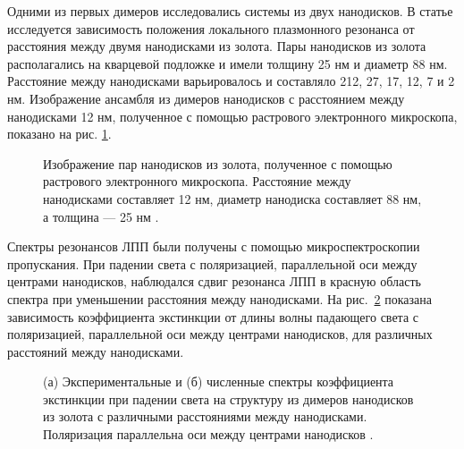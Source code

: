 Одними из первых димеров исследовались системы из двух нанодисков. В статье \cite{plasonrulereq} исследуется зависимость положения локального плазмонного резонанса от расстояния между двумя нанодисками из золота. Пары нанодисков из золота располагались на кварцевой подложке и имели толщину 25 нм и диаметр 88 нм. Расстояние между нанодисками варьировалось и составляло 212, 27, 17, 12, 7 и 2 нм. Изображение ансамбля из димеров нанодисков с расстоянием между нанодисками 12 нм, полученное с помощью растрового электронного микроскопа, показано на рис. \ref{img:PR_SEM}.
\begin{figure}
\caption{Изображение пар нанодисков из золота, полученное с помощью растрового электронного микроскопа. Расстояние между нанодисками составляет 12 нм, диаметр нанодиска составляет 88 нм, а толщина --- 25 нм \cite{plasonrulereq}.}
\label{img:PR_SEM}
\end{figure}
Спектры резонансов ЛПП были получены с помощью микроспектроскопии пропускания. При падении света с поляризацией, параллельной оси между центрами нанодисков, наблюдался сдвиг резонанса ЛПП в красную область спектра при уменьшении расстояния между нанодисками. На рис.~\ref{img:PR_extinction} показана зависимость коэффициента экстинкции от длины волны падающего света с поляризацией, параллельной оси между центрами нанодисков, для различных расстояний между нанодисками.
\begin{figure}[t]
\caption{(а) Экспериментальные и (б) численные спектры коэффициента экстинкции при падении света на структуру из димеров нанодисков из золота с различными расстояниями между нанодисками. Поляризация параллельна оси между центрами нанодисков \cite{plasonrulereq}.}
\label{img:PR_extinction}
\end{figure}
